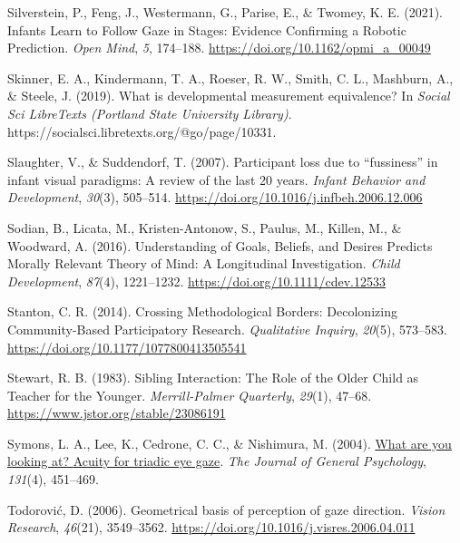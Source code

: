 \documentclass[
]{scrbook}
\newlength{\cslhangindent}
\newenvironment{CSLReferences}[2] %
 {\begin{list}{}{%
  \setlength{\itemindent}{0pt}
  \setlength{\leftmargin}{0pt}
  \setlength{\parsep}{0pt}
  \ifodd #1
   \setlength{\leftmargin}{\cslhangindent}
   \setlength{\itemindent}{-1\cslhangindent}
  \fi
  \setlength{\itemsep}{#2\baselineskip}}}
 {\end{list}}
\begin{document}
\begin{CSLReferences}{1}{0}
Silverstein, P., Feng, J., Westermann, G., Parise, E., \& Twomey, K. E. (2021). Infants {Learn} to {Follow Gaze} in {Stages}: {Evidence Confirming} a {Robotic Prediction}. \emph{Open Mind}, \emph{5}, 174--188. \url{https://doi.org/10.1162/opmi_a_00049}

Skinner, E. A., Kindermann, T. A., Roeser, R. W., Smith, C. L., Mashburn, A., \& Steele, J. (2019). What is developmental measurement equivalence? In \emph{Social Sci LibreTexts (Portland State University Library)}. https://socialsci.libretexts.org/@go/page/10331.

Slaughter, V., \& Suddendorf, T. (2007). Participant loss due to {``fussiness''} in infant visual paradigms: {A} review of the last 20 years. \emph{Infant Behavior and Development}, \emph{30}(3), 505--514. \url{https://doi.org/10.1016/j.infbeh.2006.12.006}

Sodian, B., Licata, M., Kristen-Antonow, S., Paulus, M., Killen, M., \& Woodward, A. (2016). Understanding of {Goals}, {Beliefs}, and {Desires Predicts Morally Relevant Theory} of {Mind}: {A Longitudinal Investigation}. \emph{Child Development}, \emph{87}(4), 1221--1232. \url{https://doi.org/10.1111/cdev.12533}

Stanton, C. R. (2014). Crossing {Methodological Borders}: {Decolonizing Community-Based Participatory Research}. \emph{Qualitative Inquiry}, \emph{20}(5), 573--583. \url{https://doi.org/10.1177/1077800413505541}

Stewart, R. B. (1983). Sibling {Interaction}: {The Role} of the {Older Child} as {Teacher} for the {Younger}. \emph{Merrill-Palmer Quarterly}, \emph{29}(1), 47--68. \url{https://www.jstor.org/stable/23086191}

Symons, L. A., Lee, K., Cedrone, C. C., \& Nishimura, M. (2004). \href{https://www.ncbi.nlm.nih.gov/pmc/articles/PMC2564292}{What are you looking at? {Acuity} for triadic eye gaze}. \emph{The Journal of General Psychology}, \emph{131}(4), 451--469.

Todorović, D. (2006). Geometrical basis of perception of gaze direction. \emph{Vision Research}, \emph{46}(21), 3549--3562. \url{https://doi.org/10.1016/j.visres.2006.04.011}


\end{CSLReferences}
\end{document}
